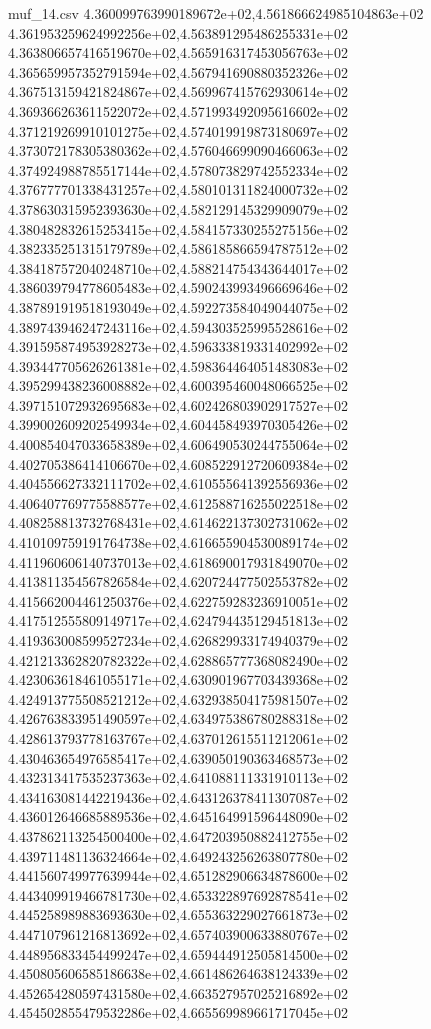 \begin{filecontents*}{muf_14.csv}
4.360099763990189672e+02,4.561866624985104863e+02
4.361953259624992256e+02,4.563891295486255331e+02
4.363806657416519670e+02,4.565916317453056763e+02
4.365659957352791594e+02,4.567941690880352326e+02
4.367513159421824867e+02,4.569967415762930614e+02
4.369366263611522072e+02,4.571993492095616602e+02
4.371219269910101275e+02,4.574019919873180697e+02
4.373072178305380362e+02,4.576046699090466063e+02
4.374924988785517144e+02,4.578073829742552334e+02
4.376777701338431257e+02,4.580101311824000732e+02
4.378630315952393630e+02,4.582129145329909079e+02
4.380482832615253415e+02,4.584157330255275156e+02
4.382335251315179789e+02,4.586185866594787512e+02
4.384187572040248710e+02,4.588214754343644017e+02
4.386039794778605483e+02,4.590243993496669646e+02
4.387891919518193049e+02,4.592273584049044075e+02
4.389743946247243116e+02,4.594303525995528616e+02
4.391595874953928273e+02,4.596333819331402992e+02
4.393447705626261381e+02,4.598364464051483083e+02
4.395299438236008882e+02,4.600395460048066525e+02
4.397151072932695683e+02,4.602426803902917527e+02
4.399002609202549934e+02,4.604458493970305426e+02
4.400854047033658389e+02,4.606490530244755064e+02
4.402705386414106670e+02,4.608522912720609384e+02
4.404556627332111702e+02,4.610555641392556936e+02
4.406407769775588577e+02,4.612588716255022518e+02
4.408258813732768431e+02,4.614622137302731062e+02
4.410109759191764738e+02,4.616655904530089174e+02
4.411960606140737013e+02,4.618690017931849070e+02
4.413811354567826584e+02,4.620724477502553782e+02
4.415662004461250376e+02,4.622759283236910051e+02
4.417512555809149717e+02,4.624794435129451813e+02
4.419363008599527234e+02,4.626829933174940379e+02
4.421213362820782322e+02,4.628865777368082490e+02
4.423063618461055171e+02,4.630901967703439368e+02
4.424913775508521212e+02,4.632938504175981507e+02
4.426763833951490597e+02,4.634975386780288318e+02
4.428613793778163767e+02,4.637012615511212061e+02
4.430463654976585417e+02,4.639050190363468573e+02
4.432313417535237363e+02,4.641088111331910113e+02
4.434163081442219436e+02,4.643126378411307087e+02
4.436012646685889536e+02,4.645164991596448090e+02
4.437862113254500400e+02,4.647203950882412755e+02
4.439711481136324664e+02,4.649243256263807780e+02
4.441560749977639944e+02,4.651282906634878600e+02
4.443409919466781730e+02,4.653322897692878541e+02
4.445258989883693630e+02,4.655363229027661873e+02
4.447107961216813692e+02,4.657403900633880767e+02
4.448956833454499247e+02,4.659444912505814500e+02
4.450805606585186638e+02,4.661486264638124339e+02
4.452654280597431580e+02,4.663527957025216892e+02
4.454502855479532286e+02,4.665569989661717045e+02

\end{filecontents*}
